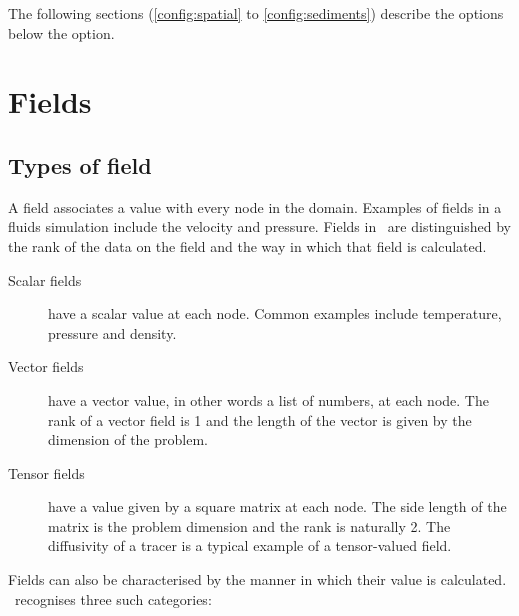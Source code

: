 The following sections (\ref{config:spatial} to \ref{config:sediments}) describe the options below the
 option.

\section{Fields}
\subsection{Types of field}

A field associates a value with every node in the domain. Examples of fields
in a fluids simulation include the velocity and pressure. Fields in \fluidity\
are distinguished by the rank of the data on the field and the way in which
that field is calculated. 

\begin{description}
\item[Scalar fields] have a scalar value at each node. Common examples
  include temperature, pressure and density.
\item[Vector fields] have a vector value, in other words a list of numbers,
  at each node. The rank of a vector field is 1 and the length of the
  vector is given by the dimension of the problem.
\item[Tensor fields] have a value given by a square matrix at each
  node. The side length of the matrix is the problem dimension and the rank
  is naturally 2. The diffusivity of a tracer is a typical example of a
  tensor-valued field.
\end{description}

Fields can also be characterised by the manner in which their value is
calculated. \fluidity\ recognises three such categories:

